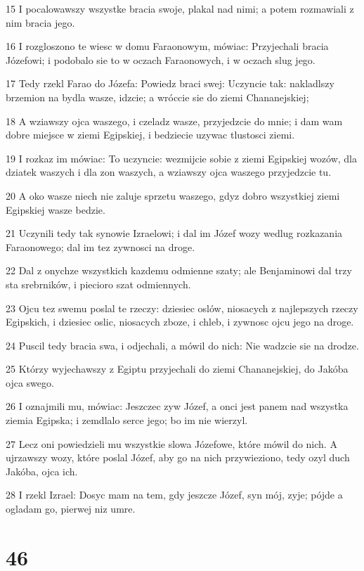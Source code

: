 \par 15 I pocalowawszy wszystke bracia swoje, plakal nad nimi; a potem rozmawiali z nim bracia jego.
\par 16 I rozgloszono te wiesc w domu Faraonowym, mówiac: Przyjechali bracia Józefowi; i podobalo sie to w oczach Faraonowych, i w oczach slug jego.
\par 17 Tedy rzekl Farao do Józefa: Powiedz braci swej: Uczyncie tak: nakladlszy brzemion na bydla wasze, idzcie; a wróccie sie do ziemi Chananejskiej;
\par 18 A wziawszy ojca waszego, i czeladz wasze, przyjedzcie do mnie; i dam wam dobre miejsce w ziemi Egipskiej, i bedziecie uzywac tlustosci ziemi.
\par 19 I rozkaz im mówiac: To uczyncie: wezmijcie sobie z ziemi Egipskiej wozów, dla dziatek waszych i dla zon waszych, a wziawszy ojca waszego przyjedzcie tu.
\par 20 A oko wasze niech nie zaluje sprzetu waszego, gdyz dobro wszystkiej ziemi Egipskiej wasze bedzie.
\par 21 Uczynili tedy tak synowie Izraelowi; i dal im Józef wozy wedlug rozkazania Faraonowego; dal im tez zywnosci na droge.
\par 22 Dal z onychze wszystkich kazdemu odmienne szaty; ale Benjaminowi dal trzy sta srebrników, i piecioro szat odmiennych.
\par 23 Ojcu tez swemu poslal te rzeczy: dziesiec oslów, niosacych z najlepszych rzeczy Egipskich, i dziesiec oslic, niosacych zboze, i chleb, i zywnosc ojcu jego na droge.
\par 24 Puscil tedy bracia swa, i odjechali, a mówil do nich: Nie wadzcie sie na drodze.
\par 25 Którzy wyjechawszy z Egiptu przyjechali do ziemi Chananejskiej, do Jakóba ojca swego.
\par 26 I oznajmili mu, mówiac: Jeszczec zyw Józef, a onci jest panem nad wszystka ziemia Egipska; i zemdlalo serce jego; bo im nie wierzyl.
\par 27 Lecz oni powiedzieli mu wszystkie slowa Józefowe, które mówil do nich. A ujrzawszy wozy, które poslal Józef, aby go na nich przywieziono, tedy ozyl duch Jakóba, ojca ich.
\par 28 I rzekl Izrael: Dosyc mam na tem, gdy jeszcze Józef, syn mój, zyje; pójde a ogladam go, pierwej niz umre.

\chapter{46}


